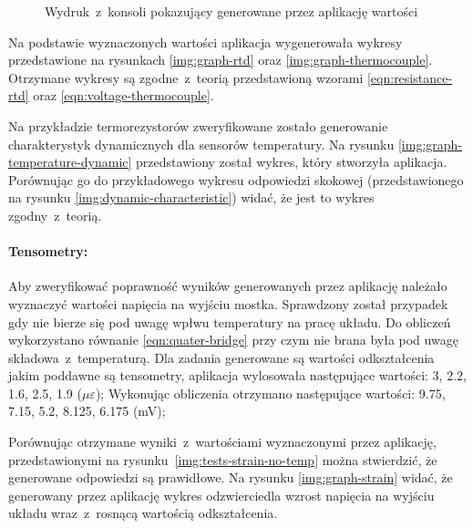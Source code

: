 \begin{figure}[!htbp]
  \hfill
  \hfill
  \hfill
  \caption{\label{img:calc-console-temperature}Wydruk~z~konsoli pokazujący generowane przez
    aplikację wartości}
\end{figure}

Na podstawie wyznaczonych wartości aplikacja wygenerowała wykresy przedstawione na rysunkach
\ref{img:graph-rtd} oraz \ref{img:graph-thermocouple}. Otrzymane wykresy są zgodne~z~teorią
przedstawioną wzorami \ref{eqn:resistance-rtd} oraz \ref{eqn:voltage-thermocouple}.



Na przykładzie termorezystorów zweryfikowane zostało generowanie charakterystyk dynamicznych dla
sensorów temperatury. Na rysunku \ref{img:graph-temperature-dynamic} przedstawiony został wykres,
który stworzyła aplikacja. Porównując go do przykładowego wykresu odpowiedzi skokowej
(przedstawionego na rysunku \ref{img:dynamic-characteristic}) widać, że jest to wykres
zgodny~z~teorią.


\FloatBarrier
\paragraph{Tensometry:} Aby zweryfikować poprawność wyników generowanych przez aplikację należało
wyznaczyć wartości napięcia na wyjściu mostka. Sprawdzony został przypadek gdy nie bierze się pod
uwagę wpłwu temperatury na pracę układu. Do obliczeń wykorzystano równanie \ref{eqn:quater-bridge}
przy czym nie brana była pod uwagę składowa~z~temperaturą. Dla zadania generowane są wartości
odkształcenia jakim poddawne są tensometry, aplikacja wylosowała następujące wartości: 3, 2.2, 1.6,
2.5, 1.9 ($\mu\varepsilon$); Wykonując obliczenia otrzymano następujące wartości: 9.75, 7.15, 5.2,
8.125, 6.175 (mV);

Porównując otrzymane wyniki~z~wartościami wyznaczonymi przez aplikację, przedstawionymi na
rysunku~\ref{img:tests-strain-no-temp} można stwierdzić, że generowane odpowiedzi są prawidłowe.
Na rysunku \ref{img:graph-strain} widać, że generowany przez aplikację wykres odzwierciedla wzrost
napięcia na wyjściu układu wraz~z~rosnącą wartością odkształcenia.


